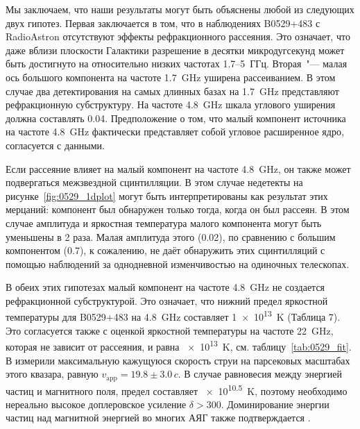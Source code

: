 Мы заключаем, что наши результаты могут быть объяснены любой из следующих двух гипотез. Первая
заключается в том, что в наблюдениях B0529+483 с RadioAstron отсутствуют эффекты рефракционного
рассеяния. Это означает, что даже вблизи плоскости Галактики разрешение в десятки микродугсекунд
может быть достигнуто на относительно низких частотах 1.7--5~ГГц. Вторая~"--- малая ось большого
компонента на частоте \SI{1.7}{\GHz} уширена рассеиванием. В этом случае два детектирования на
самых длинных базах на \SI{1.7}{\GHz} представляют рефракционную субструктуру. На частоте
\SI{4.8}{\GHz} шкала углового уширения должна составлять \SI{0.04}{\mas}. Предположение о том, что
малый компонент источника на частоте \SI{4.8}{\GHz} фактически представляет собой угловое
расширенное ядро, согласуется с данными.

Если рассеяние влияет на малый компонент на частоте \SI{4.8}{\GHz}, он также может подвергаться
межзвездной сцинтилляции. В этом случае недетекты на рисунке~\ref{fig:0529_1dplot} могут быть
интерпретированы как результат этих мерцаний: компонент был обнаружен только тогда, когда он был
рассеян. В этом случае амплитуда и яркостная температура малого компонента могут быть
уменьшены в 2 раза. Малая амплитуда этого (\SI{0.02}{\jansky}), по сравнению с большим компонентом
(\SI{0.7}{\jansky}), к сожалению, не даёт обнаружить этих сцинтилляций с помощью наблюдений
за однодневной изменчивостью на одиночных телескопах.

В обеих этих гипотезах малый компонент на частоте \SI{4.8}{\GHz} не создается рефракционной
субструктурой. Это означает, что нижний предел яркостной температуры для B0529+483 на
\SI{4.8}{\GHz} составляет \SI{1e13}{\kelvin} (Таблица 7). Это согласуется также с оценкой яркостной
температуры на частоте \SI{22}{\GHz}, которая не зависит от рассеяния, и равна \SI{e13}{\kelvin},
см. таблицу~\ref{tab:0529_fit}. В \cite{Lister_2016} измерили максимальную кажущуюся скорость
струи на парсековых масштабах этого квазара, равную $v_\text{app}=19.8\pm3.0\,c$. В случае
равновесия между энергией частиц и магнитного поля, предел составляет \SI{e10.5}{\kelvin}, поэтому
необходимо нереально высокое доплеровское усиление $\delta > 300$. Доминирование энергии частиц
над магнитной энергией во многих АЯГ также подтверждается \cite{Nokhrina_2017}.

